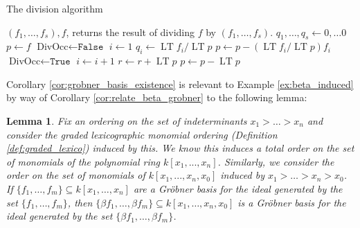 \documentclass[12pt]{article}
\theoremstyle{plain}
\newtheorem{lemma}[thm]{Lemma}
\theoremstyle{definition}
\begin{document}
\begin{algorithm}\label{alg:division_alg}
	\caption{The division algorithm}\label{alg:division}
	\begin{algorithmic}
		\Require $(f_1,\hdots,f_s),f$, returns the result of dividing $f$ by $(f_1,\hdots,f_s)$.
		\State $q_1,\hdots, q_s \gets 0,\hdots 0$
		\State $p \gets f$
		\State $\text{DivOcc} \gets \texttt{False}$
		\State $i \gets 1$
		\State $q_i \gets \operatorname{LT}f_i/\operatorname{LT}p$
		\State $p \gets p - (\operatorname{LT}f_i/\operatorname{LT}p)f_i$
		\State $\text{DivOcc} \gets \texttt{True}$
		\Else 
		\State $i \gets i + 1$
		\EndIf
		\State $r \gets r + \operatorname{LT}p$
		\State $p \gets p - \operatorname{LT}p$
		\EndIf
		\EndWhile
		\EndWhile\\
	\end{algorithmic}
\end{algorithm}
Corollary \ref{cor:grobner_basis_existence} is relevant to Example \ref{ex:beta_induced} by way of Corollary \ref{cor:relate_beta_grobner} to the following lemma:
\begin{lemma}\label{lem:grobern_betagrobner}
	Fix an ordering on the set of indeterminants $x_1 > \hdots > x_n$ and consider the graded lexicographic monomial ordering (Definition \ref{def:graded_lexico}) induced by this. We know this induces a total order on the set of monomials of the polynomial ring $k[x_1,...,x_n]$. Similarly, we consider the order on the set of monomials of $k[x_1,...,x_n,x_0]$ induced by $x_1 > \hdots > x_n > x_0$. If $\{f_1,\hdots,f_m\} \subseteq k[x_1,\hdots,x_n]$ are a Gr\"{o}bner basis for the ideal generated by the set $\{f_1, \hdots, f_m\}$, then $\{\beta f_1, \hdots, \beta f_m\} \subseteq k[x_1,\hdots, x_n, x_0]$ is a Gr\"{o}bner basis for the ideal generated by the set $\{ \beta f_1, \hdots, \beta f_m\}$.
\end{lemma}
\end{document}
